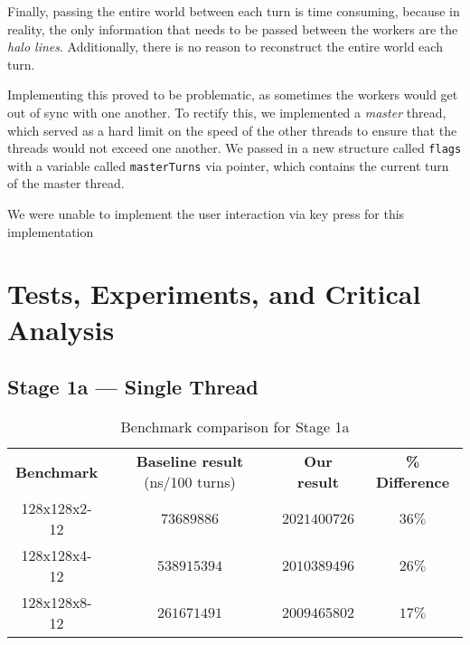 \documentclass[10pt,a4paper,dvipsnames,cmyk]{scrartcl}
\begin{document}
\begin{multicols}{2}
Finally, passing the entire world between each turn is time consuming,
because in reality, the only information that needs to be passed between
the workers are the \textit{halo lines}. Additionally, there is no reason
to reconstruct the entire world each turn.

Implementing this proved to be problematic, as sometimes the workers would
get out of sync with one another. To rectify this, we implemented a
\textit{master} thread, which served as a hard limit on the speed of the
other threads to ensure that the threads would not exceed one another. We
passed in a new structure called \texttt{flags} with a variable called
\texttt{masterTurns} via pointer, which contains the current turn of the
master thread.

We were unable to implement the user interaction via key press for this implementation


\end{multicols}

\newpage
\section*{Tests, Experiments, and Critical Analysis}%
\label{sec:experiment-and-analysis}

\subsection*{Stage 1a --- Single Thread}%
\label{sub:single-thread}

\begin{table}[!htb]
\caption{Benchmark comparison for Stage 1a}
\begin{center}
    \begin{tabular}{|c|c|c|c|}
        \hline
        \textbf{Benchmark} & \textbf{Baseline result} (ns/100 turns) &
        \textbf{Our result} & \textbf{\% Difference} \\ \hhline{|=|=|=|=|}
        128x128x2-12 & $73689886$ & $2021400726$ & $36\%$ \\ \hline
        128x128x4-12 & $538915394$ & $2010389496$ & $26\%$ \\ \hline
        128x128x8-12 & $261671491$ & $2009465802$ & $17\%$ \\ \hline
    \end{tabular}
\end{center}
\end{table}
\end{document}
